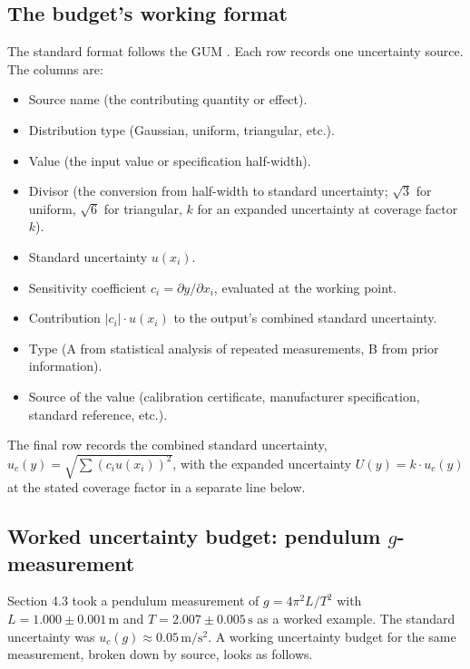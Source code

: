 \subsection{The budget's working format}

The standard format follows the GUM \cite{std:iso-iec-guide98}. Each
row records one uncertainty source. The columns are:

\begin{itemize}[leftmargin=*]
  \item Source name (the contributing quantity or effect).
  \item Distribution type (Gaussian, uniform, triangular, etc.).
  \item Value (the input value or specification half-width).
  \item Divisor (the conversion from half-width to standard
    uncertainty; $\sqrt{3}$ for uniform, $\sqrt{6}$ for triangular,
    $k$ for an expanded uncertainty at coverage factor $k$).
  \item Standard uncertainty $u(x_{i})$.
  \item Sensitivity coefficient $c_{i} = \partial y / \partial x_{i}$,
    evaluated at the working point.
  \item Contribution $|c_{i}| \cdot u(x_{i})$ to the output's
    combined standard uncertainty.
  \item Type (A from statistical analysis of repeated measurements,
    B from prior information).
  \item Source of the value (calibration certificate, manufacturer
    specification, standard reference, etc.).
\end{itemize}

The final row records the combined standard uncertainty,
$u_{c}(y) = \sqrt{\sum (c_{i} u(x_{i}))^{2}}$, with the
expanded uncertainty $U(y) = k \cdot u_{c}(y)$ at the stated
coverage factor in a separate line below.

\subsection{Worked uncertainty budget: pendulum $g$-measurement}

Section 4.3 took a pendulum measurement of $g = 4\pi^{2} L/T^{2}$
with $L = 1.000 \pm 0.001\,\si{\meter}$ and $T = 2.007 \pm 0.005\,
\si{\second}$ as a worked example. The standard uncertainty was
$u_{c}(g) \approx 0.05\,\si{\meter\per\second\squared}$. A working
uncertainty budget for the same measurement, broken down by
source, looks as follows.

